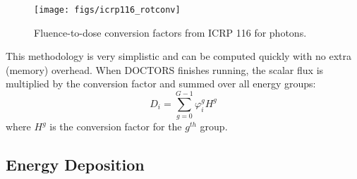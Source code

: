 \begin{figure}[tb]
  \begin{center}
   \texttt{[image: figs/icrp116\_rotconv]}
  \end{center}
  \caption{Fluence-to-dose conversion factors from ICRP 116 for photons.}
\label{fig:icrp116_rotconv}
\end{figure}

This methodology is very simplistic and can be computed quickly with no extra (memory) overhead. When DOCTORS finishes running, the scalar flux is multiplied by the conversion factor and summed over all energy groups:
\begin{equation}\label{eq:doseicrp}
D_i = \sum_{g=0}^{G-1} \varphi_i^g H^g
\end{equation}
where $H^g$ is the conversion factor for the $g^{th}$ group.

\subsection{Energy Deposition}


